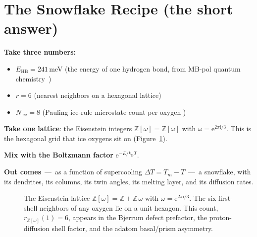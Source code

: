 \documentclass[final]{siamltex}
\newcommand{\EHB}{E_{\text{HB}}}
\newcommand{\Nrule}{N_{\text{ice}}}
\newcommand{\kB}{k_{\mathrm{B}}}
\newcommand{\Z}{\mathbb{Z}}
\newcommand{\e}{\mathrm{e}}
\newcommand{\Eisenstein}{\mathbb{Z}[\omega]}
\begin{document}
\section{The Snowflake Recipe (the short answer)}

\begin{tcolorbox}[colback=blue!5, colframe=myblue, title=\textbf{The Recipe}]
\textbf{Take three numbers:}
\begin{itemize}[leftmargin=2em,nosep]
\item $\EHB = 241$\,meV (the energy of one hydrogen bond,
   from MB-pol quantum chemistry~\cite{MamounPaperIV})
\item $r = 6$ (nearest neighbors on a hexagonal lattice)
\item $\Nrule = 8$ (Pauling ice-rule microstate count per oxygen
   \cite{Pauling1935})
\end{itemize}

\textbf{Take one lattice}: the Eisenstein integers $\Eisenstein =
\Z[\omega]$ with $\omega = \e^{2\pi\mathrm{i}/3}$.  This is the
hexagonal grid that ice oxygens sit on (Figure~\ref{fig:eisenstein}).

\textbf{Mix with the Boltzmann factor} $\e^{-E/\kB T}$.

\textbf{Out comes}~---~as a function of supercooling
$\Delta T = T_m - T$~---~a snowflake, with its dendrites, its
columns, its twin angles, its melting layer, and its diffusion
rates.
\end{tcolorbox}

\begin{figure}[t]
\centering
{}
\caption{The Eisenstein lattice $\Eisenstein = \Z + \Z\,\omega$ with
$\omega = \e^{2\pi\mathrm{i}/3}$.  The six first-shell neighbors of any
oxygen lie on a unit hexagon.  This count, $r_{\Eisenstein}(1) = 6$,
appears in the Bjerrum defect prefactor, the proton-diffusion shell
factor, and the adatom basal/prism asymmetry.}
\label{fig:eisenstein}
\end{figure}
\end{document}
